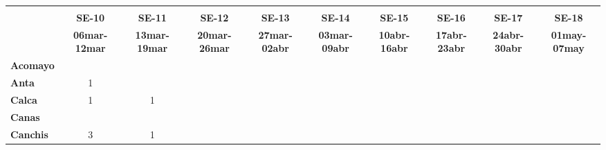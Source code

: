 \begin{tabular}{lccccccccc}
	\textbf{}              	  & \multicolumn{1}{l}{}                        & \multicolumn{1}{l}{}      & \multicolumn{1}{l}{}                         & \multicolumn{1}{l}{}                         & \multicolumn{1}{l}{}                         & \multicolumn{1}{l}{}                        & \multicolumn{1}{l}{}                         & \multicolumn{1}{l}{}                         & \multicolumn{1}{l}{}     \\
	\textbf{}                                                                          
	&\textbf{SE-10}
	&\textbf{SE-11}								&\textbf{SE-12}
	&\textbf{SE-13} 							&\textbf{SE-14}
	&\textbf{SE-15}								&\textbf{SE-16}	
	&\textbf{SE-17}								&\textbf{SE-18}\\
	\textbf{}              	  	
	&\textbf{06mar-12mar}						&\textbf{13mar-19mar}
	&\textbf{20mar-26mar}						&\textbf{27mar-02abr}
	&\textbf{03mar-09abr}						&\textbf{10abr-16abr}
	&\textbf{17abr-23abr}						&\textbf{24abr-30abr}
	&\textbf{01may-07may}\\
	\textbf{Acomayo}                        		
	&\cellcolor[HTML]{FCC46C} 
	&\cellcolor[HTML]{FCC46C}					&\cellcolor[HTML]{FCC46C}
	&\cellcolor[HTML]{FCC46C}					&\cellcolor[HTML]{FCC46C}
	&\cellcolor[HTML]{FCC46C}					&\cellcolor[HTML]{FCC46C}
	&\cellcolor[HTML]{FCC46C}					&\cellcolor[HTML]{FCC46C}\\
	\textbf{Anta}                                                   		
	&1
	&\cellcolor[HTML]{FCC46C}					&\cellcolor[HTML]{FCC46C}
	&\cellcolor[HTML]{FCC46C}					&\cellcolor[HTML]{FCC46C}
	&\cellcolor[HTML]{FCC46C} 					&\cellcolor[HTML]{FCC46C}
	&\cellcolor[HTML]{FCC46C}					&\cellcolor[HTML]{FCC46C}\\
	\textbf{Calca}      				       								            
	&1											&1											&\cellcolor[HTML]{FCC46C}		   			&\cellcolor[HTML]{FCC46C}		     		&\cellcolor[HTML]{FCC46C}					&\cellcolor[HTML]{FCC46C}			        &\cellcolor[HTML]{FCC46C}   				&\cellcolor[HTML]{FCC46C}		&\cellcolor[HTML]{FCC46C}\\             			
	\textbf{Canas}                              											
	&\cellcolor[HTML]{FCC46C}
	&\cellcolor[HTML]{FCC46C} 					&\cellcolor[HTML]{FCC46C}
	&\cellcolor[HTML]{FCC46C}					&\cellcolor[HTML]{FCC46C}
	&\cellcolor[HTML]{FCC46C} 					&\cellcolor[HTML]{FCC46C}
	&\cellcolor[HTML]{FCC46C}					&\cellcolor[HTML]{FCC46C}\\
	\textbf{Canchis}                             											
	&3											&1											&\cellcolor[HTML]{FCC46C}					&\cellcolor[HTML]{FCC46C}					&\cellcolor[HTML]{FCC46C}					&\cellcolor[HTML]{FCC46C}					&\cellcolor[HTML]{FCC46C}					&\cellcolor[HTML]{FCC46C}

\end{tabular}
